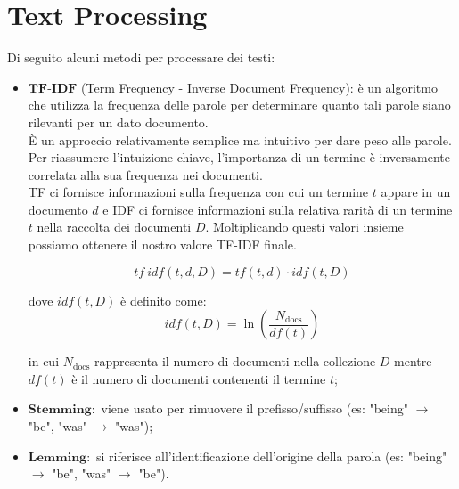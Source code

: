 \chapter{Text Processing}
    Di seguito alcuni metodi per processare dei testi:

    \begin{itemize}
        \item $\textbf{TF-IDF}$ (Term Frequency - Inverse Document Frequency): è un algoritmo che utilizza la frequenza delle parole per determinare quanto tali parole siano rilevanti per un dato documento.
        \\
        È un approccio relativamente semplice ma intuitivo per dare peso alle parole.
        \\[1\baselineskip]
        Per riassumere l'intuizione chiave, l'importanza di un termine è inversamente correlata alla sua frequenza nei documenti.
        \\[1\baselineskip]
        TF ci fornisce informazioni sulla frequenza con cui un termine $t$ appare in un documento $d$ e IDF ci fornisce informazioni sulla relativa rarità di un termine $t$ nella raccolta dei documenti $D$.
        Moltiplicando questi valori insieme possiamo ottenere il nostro valore TF-IDF finale.

            $$ tf\ idf(t, d, D) = tf(t, d) \cdot idf(t, D) $$

        dove $idf(t, D)$ è definito come:
            $$ idf(t, D) = \ln \left( \frac{N_{\textrm{docs}}}{df(t)} \right)$$
        
        in cui $N_{\textrm{docs}}$ rappresenta il numero di documenti nella collezione $D$ mentre $df(t)$ è il numero di documenti contenenti il termine $t$;
        \\[0.5\baselineskip]

        \item $\textbf{Stemming}:$ viene usato per rimuovere il prefisso/suffisso (es: "being" $\longrightarrow$ "be", "was" $\longrightarrow$ "was");
            \\[0.5\baselineskip]
        \item $\textbf{Lemming}:$ si riferisce all'identificazione dell'origine della parola (es: "being" $\longrightarrow$ "be", "was" $\longrightarrow$ "be").
    \end{itemize}

    \clearpage